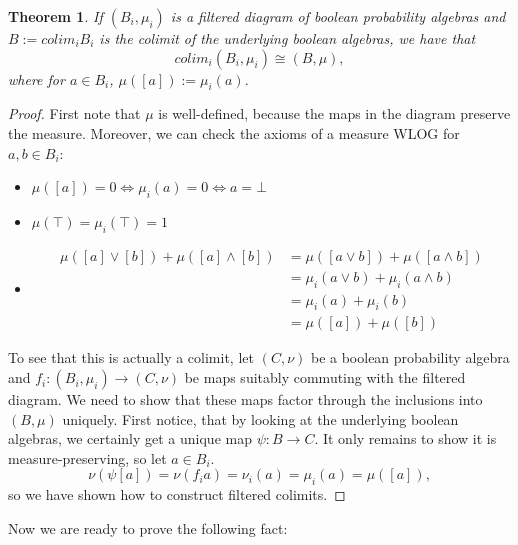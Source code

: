 \documentclass[a4paper,draft]{amsproc}
\theoremstyle{plain}
\newtheorem{theorem}{Theorem}[section]
\theoremstyle{definition}
\theoremstyle{remark}
\numberwithin{equation}{section}
\begin{document}
\begin{theorem} 
If $(B_i, \mu_i)$ is a filtered diagram of boolean probability algebras and $B := colim_i B_i$ is the colimit of the underlying boolean algebras, we have that
\[
colim_i (B_i, \mu_i) \cong (B, \mu),
\]
where for $a \in B_i$, $\mu([a]) := \mu_i(a)$.
\end{theorem}
\begin{proof}
First note that $\mu$ is well-defined, because the maps in the diagram preserve the measure. Moreover, we can check the axioms of a measure WLOG for $a,b \in B_i$:
\begin{itemize}
\item $\mu([a]) = 0 \Leftrightarrow \mu_i(a) = 0 \Leftrightarrow a = \bot$
\item $\mu(\top) = \mu_i(\top) = 1$
\item \begin{align*}
\mu([a] \vee [b]) + \mu([a] \wedge [b]) &= \mu([a \vee b]) + \mu([a \wedge b]) \\
&= \mu_i(a \vee b) + \mu_i(a \wedge b) \\
&= \mu_i(a) + \mu_i(b) \\
&= \mu([a]) + \mu([b])
\end{align*}
\end{itemize}
To see that this is actually a colimit, let $(C, \nu)$ be a boolean probability algebra and $f_i : (B_i, \mu_i) \to (C, \nu)$ be maps suitably commuting with the filtered diagram. We need to show that these maps factor through the inclusions into $(B, \mu)$ uniquely. First notice, that by looking at the underlying boolean algebras, we certainly get a unique map $\psi: B \to C$.  It only remains to show it is measure-preserving, so let $a \in B_i$.
\[
\nu(\psi [a]) = \nu(f_i a) = \nu_i(a) = \mu_i(a) = \mu([a]),
\]
so we have shown how to construct filtered colimits.
\end{proof}

Now we are ready to prove the following fact:
\end{document}
